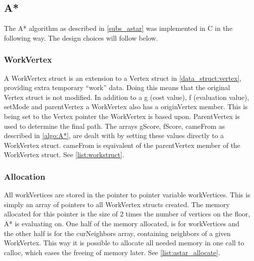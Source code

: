 \subsection{A*}


The A* algorithm as described in \cref{subs_astar} was implemented in C in the following way. The design choices will follow below.

\subsubsection{WorkVertex}



A WorkVertex struct is an extension to a Vertex struct in \cref{data_struct:vertex}, providing extra temporary \enquote{work} data. Doing this means that the original Vertex struct is not modified. In addition to a g (cost value), f (evaluation value), setMode and parentVertex a WorkVertex also has a originVertex member. This is being set to the Vertex pointer the WorkVertex is based upon. ParentVertex is used to determine the final path. The arrays gScore, fScore, cameFrom as described in \cref{algo:A*}, are dealt with by setting these values directly to a WorkVertex struct. cameFrom is equivalent of the parentVertex member of the WorkVertex struct. See \cref{list:workstruct}.

\subsubsection{Allocation}



All workVertices are stored in the pointer to pointer variable workVertices. This is simply an array of pointers to all WorkVertex structs created. The memory allocated for this pointer is the size of 2 times the number of vertices on the floor, A* is evaluating on. One half of the memory allocated, is for workVertices and the other half is for the curNeighbors array, containing neighbors of a given WorkVertex.  This way it is possible to allocate all needed memory in one call to calloc, which eases the freeing of memory later. See \cref{list:astar_allocate}.


